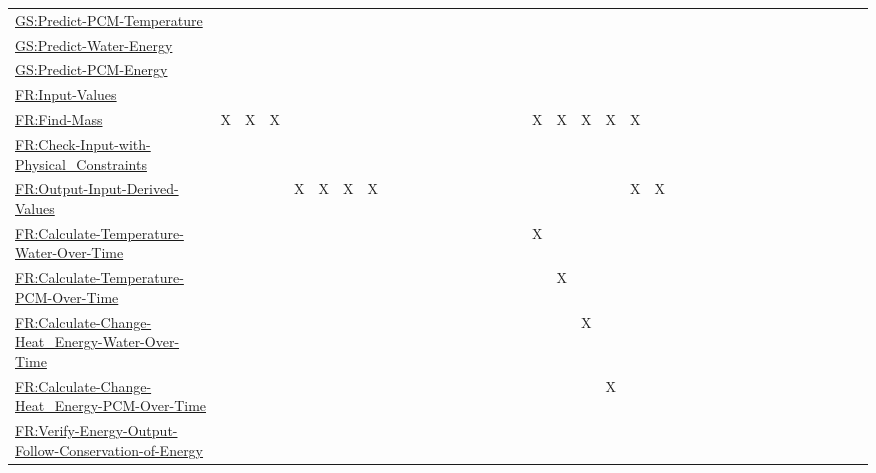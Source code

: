 \documentclass[12pt]{article}
\begin{document}
\begin{longtable}{l l l l l l l l l l l l l l l l l l l l l l l l l l l l l l l l l l l l l l}
\\
\hyperref[pcmTempGS]{GS:Predict-PCM-Temperature} &  &  &  &  &  &  &  &  &  &  &  &  &  &  &  &  &  &  &  &  &  &  &  &  &  &  &  &  &  &  &  &  &  &  &  &  & 
\\
\hyperref[waterEnergyGS]{GS:Predict-Water-Energy} &  &  &  &  &  &  &  &  &  &  &  &  &  &  &  &  &  &  &  &  &  &  &  &  &  &  &  &  &  &  &  &  &  &  &  &  & 
\\
\hyperref[pcmEnergyGS]{GS:Predict-PCM-Energy} &  &  &  &  &  &  &  &  &  &  &  &  &  &  &  &  &  &  &  &  &  &  &  &  &  &  &  &  &  &  &  &  &  &  &  &  & 
\\
\hyperref[inputValues]{FR:Input-Values} &  &  &  &  &  &  &  &  &  &  &  &  &  &  &  &  &  &  &  &  &  &  &  &  &  &  &  &  &  &  &  &  &  &  &  &  & 
\\
\hyperref[findMass]{FR:Find-Mass} & X & X & X &  &  &  &  &  &  &  &  &  &  &  &  &  &  & X & X & X & X & X &  &  &  &  &  &  &  &  &  &  &  &  &  &  & 
\\
\hyperref[checkWithPhysConsts]{FR:Check-Input-with-Physical\_Constraints} &  &  &  &  &  &  &  &  &  &  &  &  &  &  &  &  &  &  &  &  &  &  &  &  &  &  &  &  &  &  &  &  &  &  &  &  & 
\\
\hyperref[outputInputDerivVals]{FR:Output-Input-Derived-Values} &  &  &  & X & X & X & X &  &  &  &  &  &  &  &  &  &  &  &  &  &  & X & X &  &  &  &  &  &  &  &  &  &  &  &  &  & 
\\
\hyperref[calcTempWtrOverTime]{FR:Calculate-Temperature-Water-Over-Time} &  &  &  &  &  &  &  &  &  &  &  &  &  &  &  &  &  & X &  &  &  &  &  &  &  &  &  &  &  &  &  &  &  &  &  &  & 
\\
\hyperref[calcTempPCMOverTime]{FR:Calculate-Temperature-PCM-Over-Time} &  &  &  &  &  &  &  &  &  &  &  &  &  &  &  &  &  &  & X &  &  &  &  &  &  &  &  &  &  &  &  &  &  &  &  &  & 
\\
\hyperref[calcChgHeatEnergyWtrOverTime]{FR:Calculate-Change-Heat\_Energy-Water-Over-Time} &  &  &  &  &  &  &  &  &  &  &  &  &  &  &  &  &  &  &  & X &  &  &  &  &  &  &  &  &  &  &  &  &  &  &  &  & 
\\
\hyperref[calcChgHeatEnergyPCMOverTime]{FR:Calculate-Change-Heat\_Energy-PCM-Over-Time} &  &  &  &  &  &  &  &  &  &  &  &  &  &  &  &  &  &  &  &  & X &  &  &  &  &  &  &  &  &  &  &  &  &  &  &  & 
\\
\hyperref[verifyEnergyOutput]{FR:Verify-Energy-Output-Follow-Conservation-of-Energy} &  &  &  &  &  &  &  &  &  &  &  &  &  &  &  &  &  &  &  &  &  &  &  &  &  &  &  &  &  &  &  &  &  &  &  &  & 

\end{longtable}
\end{document}
